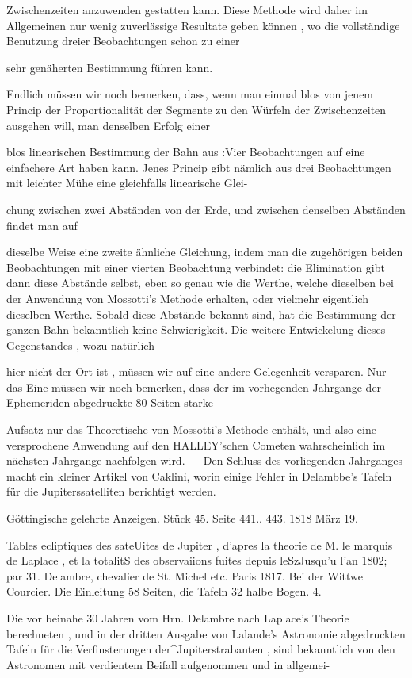 \documentclass[10pt,a4paper]{article}
\begin{document}
Zwischenzeiten anzuwenden gestatten kann. Diese Methode wird daher im Allgemeinen nur wenig zuverlässige Resultate geben können , wo die vollständige Benutzung dreier Beobachtungen schon zu einer

sehr genäherten Bestimmung führen kann.

Endlich müssen wir noch bemerken, dass, wenn man einmal blos von jenem Princip der Proportionalität der Segmente zu den Würfeln der Zwischenzeiten ausgehen will, man denselben Erfolg einer

blos linearischen Bestimmung der Bahn aus :Vier Beobachtungen auf eine einfachere Art haben kann. Jenes Princip gibt nämlich aus drei Beobachtungen mit leichter Mühe eine gleichfalls linearische Glei-

chung zwischen zwei Abständen von der Erde, und zwischen denselben Abständen findet man auf

dieselbe Weise eine zweite ähnliche Gleichung, indem man die zugehörigen beiden Beobachtungen mit einer vierten Beobachtung verbindet: die Elimination gibt dann diese Abstände selbst, eben so genau wie die Werthe, welche dieselben bei der Anwendung von Mossotti's Methode erhalten, oder vielmehr eigentlich dieselben Werthe. Sobald diese Abstände bekannt sind, hat die Bestimmung der ganzen Bahn bekanntlich keine Schwierigkeit. Die weitere Entwickelung dieses Gegenstandes , wozu natürlich

hier nicht der Ort ist , müssen wir auf eine andere Gelegenheit versparen. Nur das Eine müssen wir noch bemerken, dass der im vorhegenden Jahrgange der Ephemeriden abgedruckte 80 Seiten starke

Aufsatz nur das Theoretische von Mossotti's Methode enthält, und also eine versprochene Anwendung auf den HALLEY'schen Cometen wahrscheinlich im nächsten Jahrgange nachfolgen wird. — Den Schluss des vorliegenden Jahrganges macht ein kleiner Artikel von Caklini, worin einige Fehler in Delambbe's Tafeln für die Jupiterssatelliten berichtigt werden.

Göttingische gelehrte Anzeigen. Stück 45. Seite 441.. 443. 1818 März 19.

Tables ecliptiques des sateUites de Jupiter , d'apres la theorie de M. le marquis de Laplace , et la totalitS des observaiions fuites depuis leSzJusqu'u l'an 1802; par 31. Delambre, chevalier de St. Michel etc. Paris 1817. Bei der Wittwe Courcier. Die Einleitung 58 Seiten, die Tafeln 32 halbe Bogen. 4.

Die vor beinahe 30 Jahren vom Hrn. Delambre nach Laplace's Theorie berechneten , und in der dritten Ausgabe von Lalande's Astronomie abgedruckten Tafeln für die Verfinsterungen der\textasciicircum{}Jupiterstrabanten , sind bekanntlich von den Astronomen mit verdientem Beifall aufgenommen und in allgemei-
\end{document}
